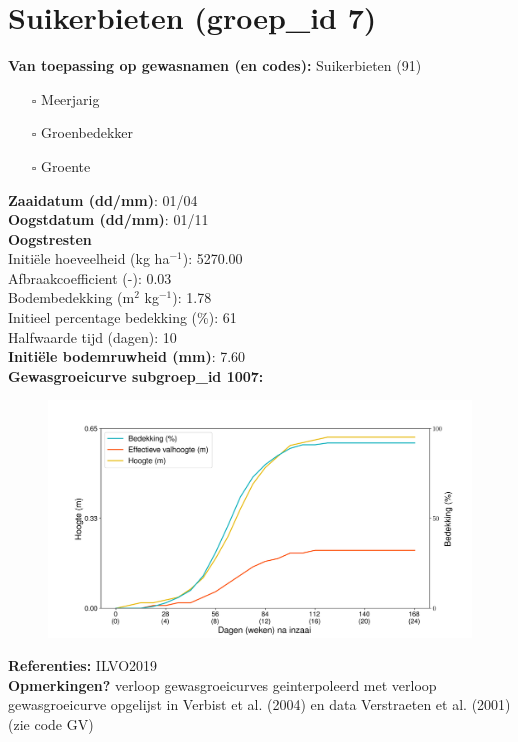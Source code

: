\documentclass{article}
\begin{document}
 \section{Suikerbieten (groep\_id 7)} 
 \textbf{Van toepassing op gewasnamen (en codes):} Suikerbieten (91) 
 \begin{multicols}{3} \begin{itemize} \item[$\square$] Meerjarig \item[$\square$] Groenbedekker \item[$\square$] Groente \end{itemize} \end{multicols} 
  \textbf{Zaaidatum (dd/mm)}: 01/04  \vspace{0.10cm} \\ 
  \textbf{Oogstdatum (dd/mm)}: 01/11  \vspace{0.10cm} \\ 
  \textbf{Oogstresten} \vspace{0.05cm} \\ 
  \tab Initi\"{e}le hoeveelheid (kg ha$^{-1}$): 5270.00 \vspace{0.05cm} \\ 
  \tab Afbraakcoefficient (-): 0.03 \vspace{0.05cm} \\ 
  \tab Bodembedekking (m$^2$ kg$^{-1}$): 1.78 \vspace{0.05cm} \\ 
  \tab Initieel percentage bedekking (\%): 61 \vspace{0.05cm} \\ 
  \tab Halfwaarde tijd (dagen): 10 \vspace{0.05cm} \\ 
  \textbf{Initi\"{e}le bodemruwheid (mm)}: 7.60 \vspace{0.05cm} \\ 
  \textbf{Gewasgroeicurve subgroep\_id 1007:} 
 \begin{center} \begin{figure}[H] \includegraphics[width=12.5cm]{temp/1007.png} \end{figure} \end{center} 
  \textbf{Referenties:} ILVO2019 \vspace{0.10cm} \\ 
  \textbf{Opmerkingen?} verloop gewasgroeicurves geinterpoleerd met verloop gewasgroeicurve opgelijst in Verbist et al. (2004) en data Verstraeten et al. (2001) (zie code GV) \vspace{0.10cm} \\ 
 \newpage 
\end{document}
